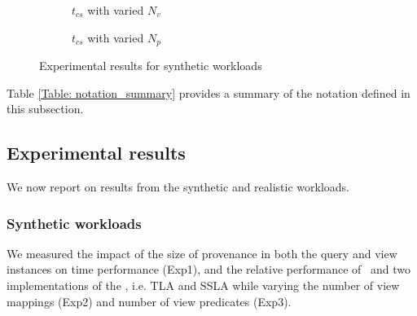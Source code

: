 \begin{figure}
\begin{subfigure}{0.30\textwidth}
        \caption{$t_{cs}$ with varied $N_v$}
        \label{fig:stress_test_view_num}
    \end{subfigure}
    \hfill
    \begin{subfigure}{0.30\textwidth}
    \hspace*{-0.8cm}
        \caption{$t_{cs}$ with varied $N_p$}
        \label{fig:stress_test_predicate_num_time}
    \end{subfigure}
    \caption{Experimental results for synthetic workloads}
\end{figure}

Table \ref{Table: notation_summary} provides a summary of the notation defined in this subsection.%

\subsection{Experimental results}
We now report on results from the synthetic and realistic workloads.

\subsubsection{Synthetic workloads} 
We measured the impact of the size of provenance in both the query and view instances on time performance (Exp1), and the relative performance of \provalg\ and two implementations of the \rba, i.e. TLA and SSLA while varying the number of view mappings (Exp2) and number of view predicates (Exp3).

